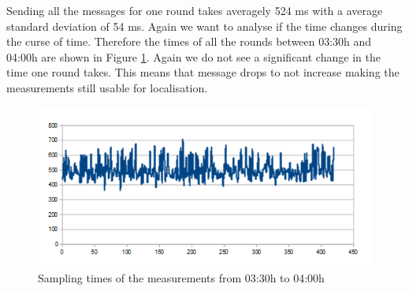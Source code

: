 Sending all the messages for one round takes averagely 524 ms with a average standard deviation of 54 ms. Again we want to analyse if the time changes during the curse of time. Therefore the times of all the rounds between 03:30h and 04:00h are shown in Figure \ref{fig:nightR}. Again we do not see a significant change in the time one round takes. This means that message drops to not increase making the measurements still usable for localisation.

\begin{figure}[tbp]
	\centering
	\includegraphics[scale=0.75]{content/images/Experiment/NightRounds}
 	\caption{Sampling times of the measurements from 03:30h to 04:00h}
	\label{fig:nightR}
\end{figure}

